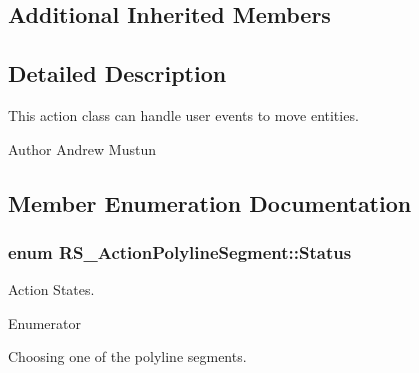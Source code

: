 \subsection*{Additional Inherited Members}


\subsection{Detailed Description}
This action class can handle user events to move entities.

\begin{DoxyAuthor}{Author}
Andrew Mustun 
\end{DoxyAuthor}


\subsection{Member Enumeration Documentation}
\hypertarget{classRS__ActionPolylineSegment_ad062c8f4755909fb12148923b853aba3}{
\subsubsection[{Status}]{\setlength{\rightskip}{0pt plus 5cm}enum {\bf R\-S\-\_\-\-Action\-Polyline\-Segment\-::\-Status}}}\label{classRS__ActionPolylineSegment_ad062c8f4755909fb12148923b853aba3}
Action States. \begin{Desc}
\item[Enumerator]\par
\begin{description}
\item[{\em 
\hypertarget{classRS__ActionPolylineSegment_ad062c8f4755909fb12148923b853aba3a302aed8269f18ad65325528cfed0437c}{Choose\-Entity}\label{classRS__ActionPolylineSegment_ad062c8f4755909fb12148923b853aba3a302aed8269f18ad65325528cfed0437c}
}]Choosing one of the polyline segments. \end{description}
\end{Desc}


